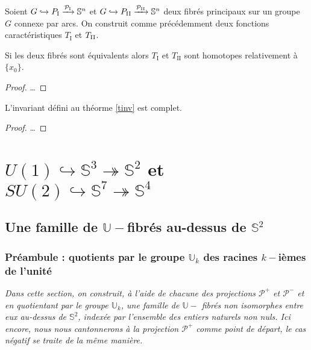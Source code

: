 \begin{theo}\label{tinv}
Soient $G \hookrightarrow P_{\text{I}} \xrightarrow{\mathcal{P}_{\text{I}}} \mathbb{S}^n$ et $G \hookrightarrow P_{\text{II}} \xrightarrow{\mathcal{P}_{\text{II}}} \mathbb{S}^n$ %
deux fibrés principaux sur un groupe $G$ connexe par arcs. %
On construit comme précédemment deux fonctions caractéristiques $T_\text{I}$ et $T_{\text{II}}$.
\par
Si les deux fibrés sont équivalents alors $T_\text{I}$ et $T_{\text{II}}$ sont homotopes relativement à $\{x_0\}$.
\end{theo}


\begin{proof}
\dots
\end{proof}

\begin{theo}\label{tinvc}
L'invariant d\'efini au th\'eorme \ref{tinv} est complet.
\end{theo}

\begin{proof}
\dots
\end{proof}

\section{$U(1)\hookrightarrow\mathbb{S}^3\twoheadrightarrow\mathbb{S}^2$ et $SU(2)\hookrightarrow\mathbb{S}^7\twoheadrightarrow\mathbb{S}^4$}

\subsection{Une famille de $\mathbb{U}-$fibr\'es au-dessus de $\mathbb{S}^2$}

\subsubsection{Pr\'eambule : quotients par le groupe $\mathbb{U}_k$ des racines $k-$i\`emes de l'unit\'e}\label{ltk}

\textit{%
Dans cette section, on construit, \`a l'aide de chacune des projections $\mathcal{P}^+$ et $\mathcal{P}^-$ et en quotientant par le groupe $\mathbb{U}_k$, %
une famille de $\mathbb{U}-$ fibr\'es non isomorphes entre eux au-dessus de $\mathbb{S}^2$, index\'ee par l'ensemble des entiers naturels non nuls. %
Ici encore, nous nous cantonnerons \`a la projection $\mathcal{P}^+$ comme point de d\'epart, le cas \og{}n\'egatif\fg{} se traite de la m\^eme mani\`ere.%
}

